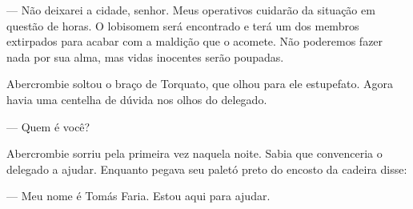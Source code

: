 --- Não deixarei a cidade, senhor. Meus operativos cuidarão da situação
em questão de horas. O lobisomem será encontrado e terá um dos membros
extirpados para acabar com a maldição que o acomete. Não poderemos fazer
nada por sua alma, mas vidas inocentes serão poupadas.

Abercrombie soltou o braço de Torquato, que olhou para ele estupefato.
Agora havia uma centelha de dúvida nos olhos do delegado.

--- Quem é você?

Abercrombie sorriu pela primeira vez naquela noite. Sabia que
convenceria o delegado a ajudar. Enquanto pegava seu paletó preto do
encosto da cadeira disse:

--- Meu nome é Tomás Faria. Estou aqui para ajudar.
